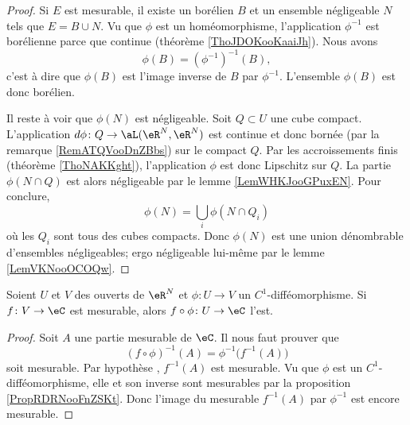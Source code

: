 \begin{proof}
    Si \( E\) est mesurable, il existe un borélien \( B\) et un ensemble négligeable \( N\) tels que \( E=B\cup N\). Vu que \( \phi\) est un homéomorphisme, l'application \( \phi^{-1}\) est borélienne parce que continue (théorème \ref{ThoJDOKooKaaiJh}). Nous avons 
    \begin{equation}
        \phi(B)=(\phi^{-1})^{-1}(B),
    \end{equation}
    c'est à dire que \( \phi(B)\) est l'image inverse de \( B\) par \( \phi^{-1}\). L'ensemble \( \phi(B)\) est donc borélien.

    Il reste à voir que \( \phi(N)\) est négligeable. Soit \( Q\subset U\) une cube compact. L'application \( d\phi\colon Q\to \aL(\eR^N,\eR^N)\) est continue et donc bornée (par la remarque \ref{RemATQVooDnZBbs}) sur le compact \( Q\). Par les accroissements finis (théorème \ref{ThoNAKKght}), l'application \( \phi\) est donc Lipschitz sur \( Q\). La partie \( \phi(N\cap Q)\) est alors négligeable par le lemme \ref{LemWHKJooGPuxEN}. Pour conclure,
    \begin{equation}
        \phi(N)=\bigcup_i\phi(N\cap Q_i)
    \end{equation}
    où les \( Q_i\) sont tous des cubes compacts. Donc \( \phi(N)\) est une union dénombrable d'ensembles négligeables; ergo négligeable lui-même par le lemme \ref{LemVKNooOCOQw}.
\end{proof}

\begin{proposition}
    Soient \( U\) et \( V\) des ouverts de \( \eR^N\) et \( \phi\colon U\to V\) un \( C^1\)-difféomorphisme. Si \( f\colon V\to \eC\) est mesurable, alors \(f\circ \phi\colon U\to \eC\) l'est.
\end{proposition}

\begin{proof}
    Soit \( A\) une partie mesurable de \( \eC\). Il nous faut prouver que
    \begin{equation}
        (f\circ\phi)^{-1}(A)=\phi^{-1}\big( f^{-1}(A) \big)
    \end{equation}
    soit mesurable. Par hypothèse , \( f^{-1}(A)\) est mesurable. Vu que \( \phi\) est un \( C^1\)-difféomorphisme, elle et son inverse sont mesurables par la proposition \ref{PropRDRNooFnZSKt}. Donc l'image du mesurable \( f^{-1}(A)\) par \( \phi^{-1}\) est encore mesurable. 
\end{proof}

